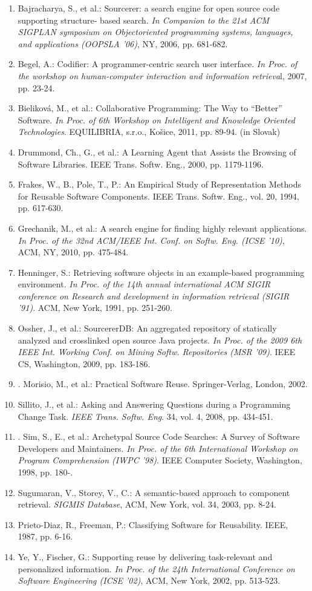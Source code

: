 \documentclass{llncs}
\begin{document}
\begin{enumerate}
\item Bajracharya, S., et al.: Sourcerer: a search engine for open source code supporting structure-
based search. \textit{In Companion to the 21st ACM SIGPLAN symposium on Objectoriented
programming systems, languages, and applications (OOPSLA '06)}, NY, 2006, pp.
681-682.
\item Begel, A.: Codifier: A programmer-centric search user interface. \textit{In Proc. of the workshop
on human-computer interaction and information retrieva}l, 2007, pp. 23-24.
\item Bieliková, M., et al.: Collaborative Programming: The Way to “Better” Software. \textit{In Proc.
of 6th Workshop on Intelligent and Knowledge Oriented Technologies}. EQUILIBRIA,
s.r.o., Košice, 2011, pp. 89-94. (in Slovak)
\item Drummond, Ch., G., et al.: A Learning Agent that Assists the Browsing of Software Libraries.
IEEE Trans. Softw. Eng., 2000, pp. 1179-1196.
\item Frakes, W., B., Pole, T., P.: An Empirical Study of Representation Methods for Reusable
Software Components. IEEE Trans. Softw. Eng., vol. 20, 1994, pp. 617-630.
\item Grechanik, M., et al.: A search engine for finding highly relevant applications. \textit{In Proc. of
the 32nd ACM/IEEE Int. Conf. on Softw. Eng. (ICSE '10)}, ACM, NY, 2010, pp. 475-484.
\item Henninger, S.: Retrieving software objects in an example-based programming environment.
\textit{In Proc. of the 14th annual international ACM SIGIR conference on Research and
development in information retrieval (SIGIR '91)}. ACM, New York, 1991, pp. 251-260.
\item Ossher, J., et al.: SourcererDB: An aggregated repository of statically analyzed and crosslinked
open source Java projects. \textit{In Proc. of the 2009 6th IEEE Int. Working Conf. on
Mining Softw. Repositories (MSR '09)}. IEEE CS, Washington, 2009, pp. 183-186.
\item. Morisio, M., et al.: Practical Software Reuse. Springer-Verlag, London, 2002.
\item Sillito, J., et al.: Asking and Answering Questions during a Programming Change Task.
\textit{IEEE Trans. Softw. Eng}. 34, vol. 4, 2008, pp. 434-451.
\item. Sim, S., E., et al.: Archetypal Source Code Searches: A Survey of Software Developers
and Maintainers. \textit{In Proc. of the 6th International Workshop on Program Comprehension
(IWPC '98)}. IEEE Computer Society, Washington, 1998, pp. 180-.
\item Sugumaran, V., Storey, V., C.: A semantic-based approach to component retrieval.
\textit{SIGMIS Database}, ACM, New York, vol. 34, 2003, pp. 8-24.
\item Prieto-Diaz, R., Freeman, P.: Classifying Software for Reusability. IEEE, 1987, pp. 6-16.
\item Ye, Y., Fischer, G.: Supporting reuse by delivering task-relevant and personalized information.
\textit{In Proc. of the 24th International Conference on Software Engineering (ICSE '02)},
ACM, New York, 2002, pp. 513-523.
\end{enumerate}
\end{document}

